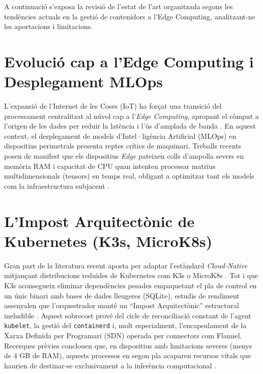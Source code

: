 %
%

A continuació s'exposa la revisió de l'estat de l'art organitzada segons les tendències actuals en la gestió de contenidors a l'Edge Computing, analitzant-ne les aportacions i limitacions.

\section{Evolució cap a l'Edge Computing i Desplegament MLOps}
L'expansió de l'Internet de les Coses (IoT) ha forçat una transició del processament centralitzat al núvol cap a l'\textit{Edge Computing}, apropant el còmput a l'origen de les dades per reduir la latència i l'ús d'amplada de banda \cite{shi2016edge}. En aquest context, el desplegament de models d'Intel·ligència Artificial (MLOps) en dispositius perimetrals presenta reptes crítics de maquinari. Treballs recents posen de manifest que els dispositius \textit{Edge} pateixen colls d'ampolla severs en memòria RAM i capacitat de CPU quan intenten processar matrius multidimensionals (tensors) en temps real, obligant a optimitzar tant els models com la infraestructura subjacent \cite{gao2025vtensor}.

\section{L'Impost Arquitectònic de Kubernetes (K3s, MicroK8s)}
Gran part de la literatura recent aposta per adaptar l'estàndard \textit{Cloud-Native} mitjançant distribucions reduïdes de Kubernetes com K3s o MicroK8s \cite{yakubov2025comparative}. 
Tot i que K3s aconsegueix eliminar dependències pesades empaquetant el pla de control en un únic binari amb bases de dades lleugeres (SQLite), estudis de rendiment assenyalen que l'orquestrador manté un ``Impost Arquitectònic'' estructural ineludible \cite{goethals2024feather}. 
Aquest sobrecost prové del cicle de reconciliació constant de l'agent \texttt{kubelet}, la gestió del \texttt{containerd} i, molt especialment, l'encapsulament de la Xarxa Definida per Programari (SDN) operada per connectors com Flannel. 
Recerques prèvies conclouen que, en dispositius amb limitacions severes (menys de 4 GB de RAM), aquests processos en segon pla acaparen recursos vitals que haurien de destinar-se exclusivament a la inferència computacional \cite{koukis2024performance}.

